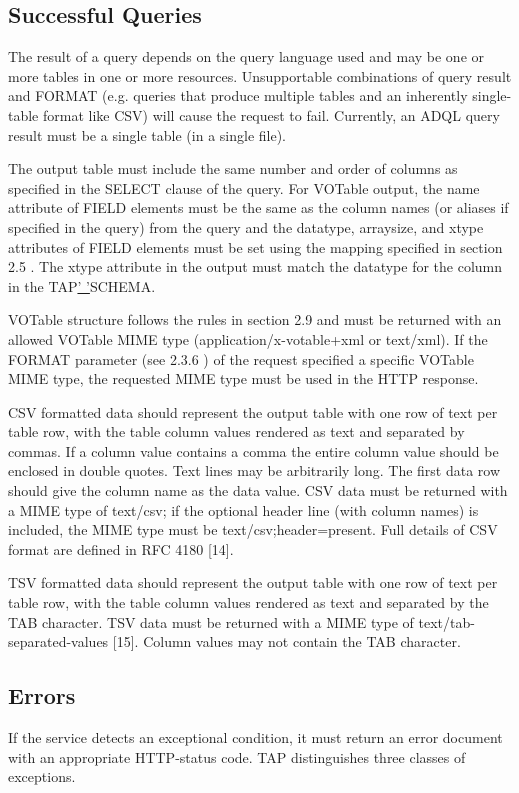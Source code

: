 \documentclass[11pt,a4paper]{ivoa}
\begin{document}
{\subsection{Successful Queries}

The result of a query depends on the query language used and may be one or more 
tables in one or more resources. Unsupportable combinations of query result and 
FORMAT (e.g. queries that produce multiple tables and an inherently 
single-table format like CSV) will cause the request to fail. Currently, an ADQL 
query result must be a single table (in a single file).

The output table must include the same number and order of columns as specified 
in the SELECT clause of the query. For VOTable output, the name attribute of 
FIELD elements must be the same as the column names (or aliases if specified in 
the query) from the query and the datatype, arraysize, and xtype attributes of 
FIELD elements must be set using the mapping specified in section 2.5 . The 
xtype attribute in the output must match the datatype for the column in the 
TAP\underline{' '}SCHEMA.

VOTable structure follows the rules in section 2.9 and must be returned with an 
allowed VOTable MIME type (application/x-votable+xml or text/xml). If the 
FORMAT parameter (see 2.3.6 ) of the request specified a specific VOTable MIME 
type, the requested MIME type must be used in the HTTP response.

CSV formatted data should represent the output table with one row of text per 
table row, with the table column values rendered as text and separated by 
commas. If a column value contains a comma the entire column value should be 
enclosed in double quotes.  Text lines may be arbitrarily long.  The first data 
row should give the column name as the data value.   CSV data must be returned 
with a MIME type of text/csv; if the optional header line (with column names) 
is included, the MIME type must be text/csv;header=present. Full details of CSV 
format are defined in RFC 4180 [14].

TSV formatted data should represent the output table with one row of text per 
table row, with the table column values rendered as text and separated by the 
TAB character. TSV data must be returned with a MIME type of 
text/tab-separated-values [15]. Column values may not contain the TAB 
character.

\subsection{Errors}
If the service detects an exceptional condition, it must return an error 
document with an appropriate HTTP-status code. TAP distinguishes three classes 
of exceptions.

}
\end{document}
